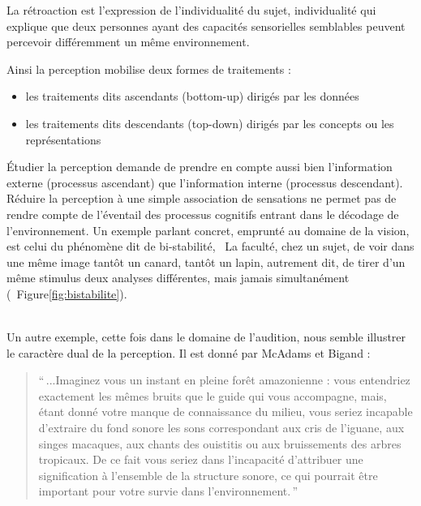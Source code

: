 La rétroaction est l'expression de l'individualité du sujet, individualité qui explique que deux personnes ayant des capacités sensorielles semblables peuvent percevoir différemment un même environnement.

Ainsi la perception mobilise deux formes de traitements :

\begin{itemize}
\item les traitements dits ascendants (bottom-up) dirigés par les données
\item les traitements dits descendants (top-down) dirigés par les concepts ou les représentations
\end{itemize}

Étudier la perception demande de prendre en compte aussi bien l'information externe (processus ascendant) que l'information interne (processus descendant). Réduire la perception à une simple association de sensations ne permet pas de rendre compte de l'éventail des processus cognitifs entrant dans le décodage de l'environnement. Un exemple parlant concret, emprunté au domaine de la vision, est celui du phénomène dit de bi-stabilité, \ie~La faculté, chez un sujet, de voir dans une même image tantôt un canard, tantôt un lapin, autrement dit, de tirer d'un même stimulus deux analyses différentes, mais jamais simultanément (\Cf~Figure\ref{fig:bistabilite}).

\\

Un autre exemple, cette fois dans le domaine de l'audition, nous semble illustrer le caractère dual de la perception. Il est donné par McAdams et Bigand \citep[p. 2]{mcadams1994penser}:

\begin{quote}
``\,...Imaginez vous un instant en pleine forêt amazonienne : vous entendriez exactement les mêmes bruits que le guide qui vous accompagne, mais, étant donné votre manque de connaissance du milieu, vous seriez incapable d'extraire du fond sonore les sons correspondant aux cris de l'iguane, aux singes macaques, aux chants des ouistitis ou aux bruissements des arbres tropicaux. De ce fait vous seriez dans l'incapacité d'attribuer une signification à l'ensemble de la structure sonore, ce qui pourrait être important pour votre survie dans l'environnement.\,''
\end{quote}

